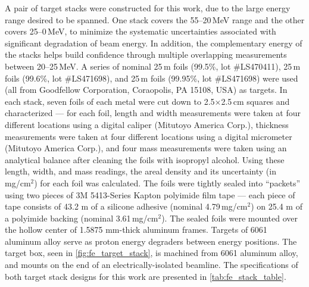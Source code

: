 A pair of target stacks were constructed for this work, due to the large energy range desired to be spanned.
One stack covers the 55--20\,MeV range and the other covers 25--0\,MeV, to minimize the systematic uncertainties associated with significant degradation of beam energy.
In addition, the complementary  energy  of the  stacks helps build confidence  through multiple overlapping measurements between 20--25\,MeV.  
A series of nominal 25\,\mmicro m  foils (99.5\%, lot \#LS470411), 25\,\mmicro m  foils (99.6\%, lot \#LS471698), and 25\,\mmicro m  foils (99.95\%, lot \#LS471698) were used (all from Goodfellow Corporation, Coraopolis, PA 15108, USA) as targets.
In each stack, seven foils of each metal were cut down to 2.5$\times$2.5\,cm squares and characterized --- for each foil, length and width measurements were taken at four different locations using a digital caliper (Mitutoyo America Corp.), thickness measurements were taken at four different locations using a digital micrometer (Mitutoyo America Corp.), and four mass measurements were taken using an analytical balance after cleaning the foils with isopropyl alcohol.
Using these length, width, and mass readings, the areal density and its uncertainty (in mg/cm$^2$) for each foil was calculated.
The foils were tightly sealed into \enquote{packets} using two pieces of  3M 5413-Series Kapton polyimide film tape --- each piece of tape consists of 43.2 \mmicro m of a silicone adhesive (nominal 4.79\,mg/cm$^2$) on 25.4 \mmicro m of a polyimide backing (nominal 3.61\,mg/cm$^2$).
The sealed foils were mounted over the hollow center of  1.5875 mm-thick aluminum frames.
Targets of 6061 aluminum alloy  serve as proton energy degraders  between energy positions.
The target box, seen in \autoref{fig:fe_target_stack}, is machined from 6061 aluminum alloy, and mounts on the end of an electrically-isolated beamline.
The specifications of both target stack designs for this work are presented in \autoref{tab:fe_stack_table}.



